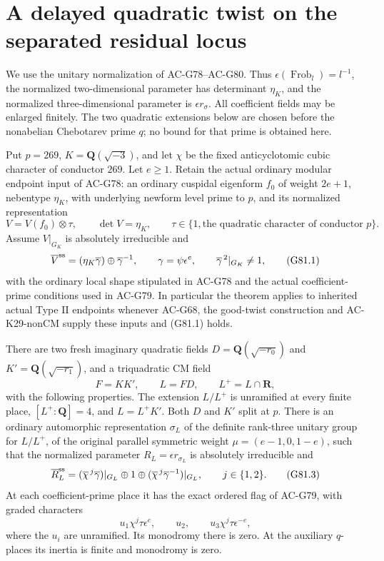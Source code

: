 \section{A delayed quadratic twist on the separated residual locus}
\label{sec:cubic-delayed-quadratic-twist}

We use the unitary normalization of AC-G78--AC-G80.  Thus
\(\epsilon(\operatorname{Frob}_l)=l^{-1}\), the normalized
two-dimensional parameter has determinant \(\eta_K\), and the
normalized three-dimensional parameter is \(\epsilon r_\sigma\).
All coefficient fields may be enlarged finitely.  The two quadratic
extensions below are chosen before the nonabelian Chebotarev prime
\(q\); no bound for that prime is obtained here.

\begin{theorem}
\label{thm:G81}
Put \(p=269\), \(K=\mathbf Q(\sqrt{-3})\), and let \(\chi\) be the
fixed anticyclotomic cubic character of conductor \(269\).
Let \(e\ge1\).  Retain the actual ordinary modular endpoint input
of AC-G78: an ordinary cuspidal eigenform \(f_0\) of weight
\(2e+1\), nebentype \(\eta_K\), with underlying newform level
prime to \(p\), and its normalized representation
\[
 V=V(f_0)\otimes\tau,\qquad
 \det V=\eta_K,\qquad
 \tau\in\{1,\text{the quadratic character of conductor }p\}.
\]
Assume \(V|_{G_K}\) is absolutely irreducible and
\[
 \overline V^{\rm ss}
   =(\eta_K\overline\gamma)\oplus\overline\gamma^{-1},
 \qquad \gamma=\psi\epsilon^e,\qquad
 \overline\gamma^{\,2}|_{G_K}\ne1,                 \tag{G81.1}
\]
with the ordinary local shape stipulated in AC-G78 and the actual
coefficient-prime conditions used in AC-G79.
In particular the theorem applies to inherited actual Type II
endpoints whenever AC-G68, the good-twist construction and
AC-K29-nonCM supply these inputs and (G81.1) holds.

There are two fresh imaginary quadratic fields
\(D=\mathbf Q(\sqrt{-r_0})\) and
\(K'=\mathbf Q(\sqrt{-r_1})\), and a triquadratic CM field
\[
 F=KK',\qquad L=FD,\qquad L^+=L\cap\mathbf R,       \tag{G81.2}
\]
with the following properties.
The extension \(L/L^+\) is unramified at every finite place,
\([L^+:\mathbf Q]=4\), and \(L=L^+K'\).
Both \(D\) and \(K'\) split at \(p\).
There is an ordinary automorphic representation \(\sigma_L\)
of the definite rank-three unitary group for \(L/L^+\), of the
original parallel symmetric weight
\(\mu=(e-1,0,1-e)\), such that the normalized parameter
\(R_L=\epsilon r_{\sigma_L}\) is absolutely irreducible and
\[
 \overline R_L^{\rm ss}
  =(\overline\chi^{\,j}\overline\gamma)|_{G_L}
       \oplus1\oplus
    (\overline\chi^{\,j}\overline\gamma^{-1})|_{G_L},
       \qquad j\in\{1,2\}.                        \tag{G81.3}
\]
At each coefficient-prime place it has the exact ordered flag
of AC-G79, with graded characters
\[
 u_1\chi^j\tau\epsilon^e,\qquad
 u_2,\qquad
 u_3\chi^j\tau\epsilon^{-e},                       \tag{G81.4}
\]
where the \(u_i\) are unramified.  Its monodromy there is zero.
At the auxiliary \(q\)-places its inertia is finite and
monodromy is zero.


\end{theorem}
